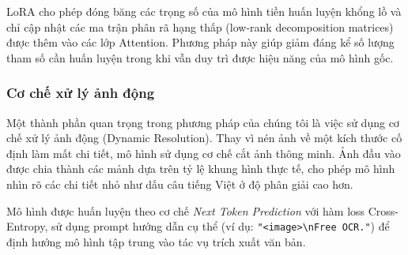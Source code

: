 LoRA cho phép đóng băng các trọng số của mô hình tiền huấn luyện khổng lồ và chỉ cập nhật các ma trận phân rã hạng thấp (low-rank decomposition matrices) được thêm vào các lớp Attention. Phương pháp này giúp giảm đáng kể số lượng tham số cần huấn luyện trong khi vẫn duy trì được hiệu năng của mô hình gốc.

\subsubsection{Cơ chế xử lý ảnh động}
Một thành phần quan trọng trong phương pháp của chúng tôi là việc sử dụng cơ chế xử lý ảnh động (Dynamic Resolution). Thay vì nén ảnh về một kích thước cố định làm mất chi tiết, mô hình sử dụng cơ chế cắt ảnh thông minh. Ảnh đầu vào được chia thành các mảnh dựa trên tỷ lệ khung hình thực tế, cho phép mô hình nhìn rõ các chi tiết nhỏ như dấu câu tiếng Việt ở độ phân giải cao hơn.

Mô hình được huấn luyện theo cơ chế \textit{Next Token Prediction} với hàm loss Cross-Entropy, sử dụng prompt hướng dẫn cụ thể (ví dụ: \texttt{"<image>\textbackslash nFree OCR."}) để định hướng mô hình tập trung vào tác vụ trích xuất văn bản.
